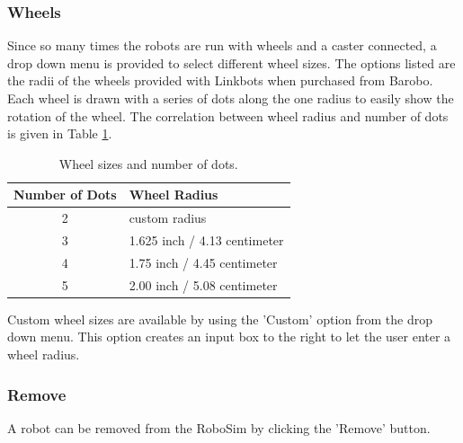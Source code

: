 \documentclass{article}
\begin{document}
\subsubsection{Wheels}
Since so many times the robots are run with wheels and a caster connected, a
drop down menu is provided to select different wheel sizes.  The options listed
are the radii of the wheels provided with Linkbots when purchased from Barobo.
Each wheel is drawn with a series of dots along the one radius to easily show
the rotation of the wheel.  The correlation between wheel radius and number of
dots is given in Table \ref{tab:wheels}.
\begin{table}[H]
	\begin{center}
	\begin{tabular}{c | l }
		\hline \hline
		\textbf{Number of Dots} & \textbf{Wheel Radius} \\ \hline
		2 & custom radius \\
		3 & 1.625 inch / 4.13 centimeter \\
		4 & 1.75 inch / 4.45 centimeter \\
		5 & 2.00 inch / 5.08 centimeter \\
		\hline \hline
	\end{tabular}
	\caption{Wheel sizes and number of dots.}
	\label{tab:wheels}
	\end{center}
\end{table}

Custom wheel sizes are available by using the 'Custom' option from the drop down
menu.  This option creates an input box to the right to let the user enter a
wheel radius.

\subsubsection{Remove}
A robot can be removed from the RoboSim by clicking the 'Remove' button.
\end{document}
